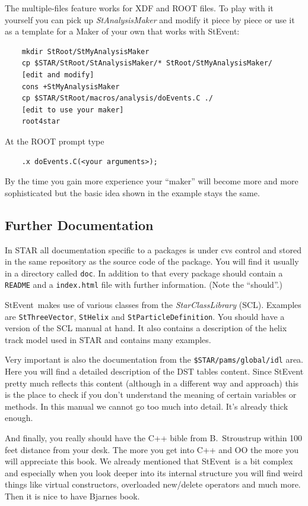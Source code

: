 \documentclass[twoside]{article}
\newcommand{\name}[1]{\textsl{#1}}%
\newcommand{\StEvent}{\textsf{StEvent}}
\begin{document}
The multiple-files feature works for XDF and ROOT files.  To play with
it yourself you can pick up \name{StAnalysisMaker} and modify it piece
by piece or use it as a template for a Maker of your own that works
with \StEvent:

\begin{verbatim}
    mkdir StRoot/StMyAnalysisMaker
    cp $STAR/StRoot/StAnalysisMaker/* StRoot/StMyAnalysisMaker/
    [edit and modify]
    cons +StMyAnalysisMaker
    cp $STAR/StRoot/macros/analysis/doEvents.C ./
    [edit to use your maker]
    root4star
\end{verbatim}
At the ROOT prompt type
\begin{verbatim}
    .x doEvents.C(<your arguments>);
\end{verbatim}
By the time you gain more experience your ``maker'' will become more
and more sophisticated but the basic idea shown in the example stays
the same.

\subsection{Further Documentation}
\label{sec:furtherDoc}

In STAR all documentation specific to a packages is under cvs control
and stored in the same repository as the source code of the package.
You will find it usually in a directory called \texttt{doc}.  In
addition to that every package should contain a \texttt{README} and a
\texttt{index.html} file with further information. (Note the
``should''.)

\StEvent\ makes use of various classes from the
\name{StarClassLibrary} (SCL).  Examples are \texttt{StThreeVector},
\texttt{StHelix} and \texttt{StParticleDefinition}. You should have a
version of the SCL manual at hand. It also contains a description of
the helix track model used in STAR and contains many
examples. 

Very important is also the documentation from the
\texttt{\$STAR/pams/global/idl} area. Here you will find a detailed
description of the DST tables content.  Since StEvent pretty much
reflects this content (although in a different way and approach) this
is the place to check if you don't understand the meaning of certain
variables or methods.  In this manual we cannot go too much into
detail. It's already thick enough.

And finally, you really should have the C++ bible from B.~Stroustrup
within 100 feet distance from your desk. The more you get into C++ and
OO the more you will appreciate this book. We already mentioned that
\StEvent\ is a bit complex and especially when you look deeper into
its internal structure you will find weird things like virtual
constructors, overloaded new/delete operators and much more.  Then it
is nice to have Bjarnes book.   \clearpage
\end{document}
